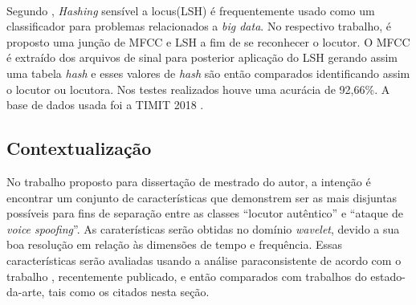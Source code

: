 \documentclass[a4paper,12pt,openright,oneside]{book}
\newenvironment{myenv}[1]
{\begin{spacing}{#1}}
	{\end{spacing}}
\begin{document}
\begin{myenv}{1.5}
\\
\par Segundo \cite{8396208}, \textit{Hashing} sensível a locus(LSH) é frequentemente usado como um classificador para problemas relacionados a \textit{big data}. No respectivo trabalho, é proposto uma junção de MFCC e LSH a fim de se reconhecer o locutor. O MFCC é extraído dos arquivos de sinal para posterior aplicação do LSH gerando assim uma tabela \textit{hash} e esses valores de \textit{hash} são então comparados identificando assim o locutor ou locutora. Nos testes realizados houve uma acurácia de 92,66\%. A base de dados usada foi a TIMIT 2018 \cite{TIMIT2018}. 
\subsection{Contextualização}
\par No trabalho proposto para dissertação de mestrado do autor, a intenção é encontrar um conjunto de características que demonstrem ser as mais disjuntas possíveis para fins de separação entre as classes ``locutor autêntico'' e ``ataque de \textit{voice spoofing}''. As caraterísticas serão obtidas no domínio \textit{wavelet}, devido a sua boa resolução em relação às dimensões de tempo e frequência. Essas características serão avaliadas usando a análise paraconsistente de acordo com o trabalho \cite{8588433}, recentemente publicado, e então comparados com trabalhos do estado-da-arte, tais como os citados nesta seção. 
\end{myenv}
\end{document}

